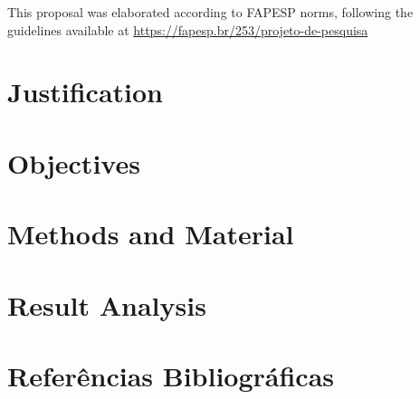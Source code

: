 \documentclass[a4paper,12pt]{article}
\numberwithin{equation}{section} %
\begin{document}
\break
This proposal was elaborated according to FAPESP norms, following the guidelines available at \url{https://fapesp.br/253/projeto-de-pesquisa}

\tableofcontents

\break


\newpage
\setlength{\parskip}{3mm}
\doublespacing

\let\clearpage\relax


\section{Justification}


\section{Objectives}
\label{sec:Objetivos}




\section{Methods and Material}


\section{Result Analysis}



\newpage
\renewcommand\refname{\vskip -2cm}
\section*{Referências Bibliográficas}

\newpage
\newpage

\end{document}
